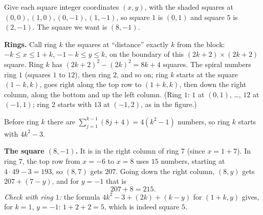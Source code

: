 Give each square integer coordinates $(x,y)$, with the shaded squares at $(0,0),(1,0),(0,-1),(1,-1)$, so square $1$ is $(0,1)$ and square $5$ is $(2,-1)$. The square we want is $(8,-1)$.

\textbf{Rings.} Call ring $k$ the squares at ``distance'' exactly $k$ from the block: $-k\le x\le 1+k$, $-1-k\le y\le k$, on the boundary of this $(2k+2)\times(2k+2)$ square. Ring $k$ has $(2k+2)^2-(2k)^2=8k+4$ squares. The spiral numbers ring $1$ (squares $1$ to $12$), then ring $2$, and so on; ring $k$ starts at the square $(1-k,k)$, goes right along the top row to $(1+k,k)$, then down the right column, along the bottom and up the left column. (Ring $1$: $1$ at $(0,1)$, \dots, $12$ at $(-1,1)$; ring $2$ starts with $13$ at $(-1,2)$, as in the figure.)

Before ring $k$ there are $\sum_{j=1}^{k-1}(8j+4)=4(k^2-1)$ numbers, so ring $k$ starts with $4k^2-3$.

\textbf{The square $(8,-1)$.} It is in the right column of ring $7$ (since $x=1+7$). In ring $7$, the top row from $x=-6$ to $x=8$ uses $15$ numbers, starting at $4\cdot49-3=193$, so $(8,7)$ gets $207$. Going down the right column, $(8,y)$ gets $207+(7-y)$, and for $y=-1$ that is
\[
207+8=\boxed{215}.
\]
\emph{Check with ring $1$:} the formula $4k^2-3+(2k)+(k-y)$ for $(1+k,y)$ gives, for $k=1$, $y=-1$: $1+2+2=5$, which is indeed square $5$.
